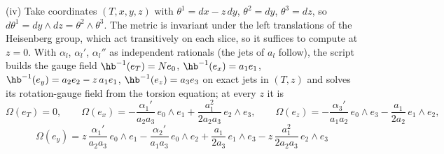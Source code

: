 (iv) Take coordinates $(T, x, y, z)$ with $\theta^{1} = dx - z\,dy$, $\theta^{2} = dy$, $\theta^{3} = dz$, so $d\theta^{1} = dy\wedge dz = \theta^{2}\wedge\theta^{3}$. The metric is invariant under the left translations of the Heisenberg group, which act transitively on each slice, so it suffices to compute at $z = 0$. With $\alpha_{l}$, $\alpha_{l}'$, $\alpha_{l}''$ as independent rationals (the jets of $a_{l}$ follow), the script builds the gauge field $\hb^{-1}(e_{T}) = N e_{0}$, $\hb^{-1}(e_{x}) = a_{1}e_{1}$, $\hb^{-1}(e_{y}) = a_{2}e_{2} - z\,a_{1}e_{1}$, $\hb^{-1}(e_{z}) = a_{3}e_{3}$ on exact jets in $(T, z)$ and solves its rotation-gauge field from the torsion equation; at every $z$ it is
\[
\Omega(e_{T}) = 0, \qquad \Omega(e_{x}) = -\frac{\alpha_{1}'}{a_{2}a_{3}}\,e_{0}\wedge e_{1} + \frac{a_{1}^{2}}{2a_{2}a_{3}}\,e_{2}\wedge e_{3}, \qquad \Omega(e_{z}) = -\frac{\alpha_{3}'}{a_{1}a_{2}}\,e_{0}\wedge e_{3} - \frac{a_{1}}{2a_{2}}\,e_{1}\wedge e_{2},
\]
\[
\Omega(e_{y}) = z\,\frac{\alpha_{1}'}{a_{2}a_{3}}\,e_{0}\wedge e_{1} - \frac{\alpha_{2}'}{a_{1}a_{3}}\,e_{0}\wedge e_{2} + \frac{a_{1}}{2a_{3}}\,e_{1}\wedge e_{3} - z\,\frac{a_{1}^{2}}{2a_{2}a_{3}}\,e_{2}\wedge e_{3}
\]
